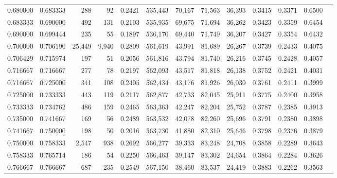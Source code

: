 \begin{tabular}{rrrrrrrrrrrrr}
0.680000 & 0.683333 &    288 &     92 &                                     0.2421 & 535,443 &  70,167 &  71,563 &  36,393 & 0.3415 & 0.3371 & 0.6500 \\
0.683333 & 0.690000 &    492 &    131 &                                     0.2103 & 535,935 &  69,675 &  71,694 &  36,262 & 0.3423 & 0.3359 & 0.6454 \\
0.690000 & 0.699444 &    235 &     55 &                                     0.1897 & 536,170 &  69,440 &  71,749 &  36,207 & 0.3427 & 0.3354 & 0.6432 \\
0.700000 & 0.706190 & 25,449 &  9,940 &                                     0.2809 & 561,619 &  43,991 &  81,689 &  26,267 & 0.3739 & 0.2433 & 0.4075 \\
0.706429 & 0.715974 &    197 &     51 &                                     0.2056 & 561,816 &  43,794 &  81,740 &  26,216 & 0.3745 & 0.2428 & 0.4057 \\
0.716667 & 0.716667 &    277 &     78 &                                     0.2197 & 562,093 &  43,517 &  81,818 &  26,138 & 0.3752 & 0.2421 & 0.4031 \\
0.716667 & 0.725000 &    341 &    108 &                                     0.2405 & 562,434 &  43,176 &  81,926 &  26,030 & 0.3761 & 0.2411 & 0.3999 \\
0.725000 & 0.733333 &    443 &    119 &                                     0.2117 & 562,877 &  42,733 &  82,045 &  25,911 & 0.3775 & 0.2400 & 0.3958 \\
0.733333 & 0.734762 &    486 &    159 &                                     0.2465 & 563,363 &  42,247 &  82,204 &  25,752 & 0.3787 & 0.2385 & 0.3913 \\
0.735000 & 0.741667 &    169 &     56 &                                     0.2489 & 563,532 &  42,078 &  82,260 &  25,696 & 0.3791 & 0.2380 & 0.3898 \\
0.741667 & 0.750000 &    198 &     50 &                                     0.2016 & 563,730 &  41,880 &  82,310 &  25,646 & 0.3798 & 0.2376 & 0.3879 \\
0.750000 & 0.758333 &  2,547 &    938 &                                     0.2692 & 566,277 &  39,333 &  83,248 &  24,708 & 0.3858 & 0.2289 & 0.3643 \\
0.758333 & 0.765714 &    186 &     54 &                                     0.2250 & 566,463 &  39,147 &  83,302 &  24,654 & 0.3864 & 0.2284 & 0.3626 \\
0.766667 & 0.766667 &    687 &    235 &                                     0.2549 & 567,150 &  38,460 &  83,537 &  24,419 & 0.3883 & 0.2262 & 0.3563 \\

\end{tabular}

